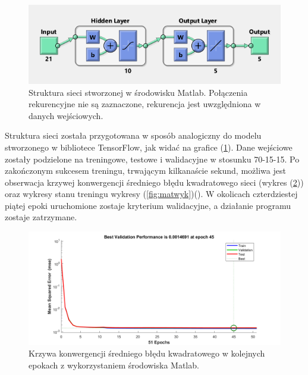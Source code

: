 \documentclass[12pt, a4paper]{article}
\let\oldref\ref
\renewcommand{\ref}[1]{(\oldref{#1})}
\begin{document}
 \begin{figure}[ht]
    \centering
    \includegraphics[width=1\textwidth]{siecmatlab}
    \caption{Struktura sieci stworzonej w środowisku Matlab. Połączenia rekurencyjne nie są zaznaczone, rekurencja jest uwzględniona w danych wejściowych.}
    \label{fig:siecmatlab}
\end{figure}

Struktura sieci została przygotowana w sposób analogiczny do modelu stworzonego w bibliotece TensorFlow, jak widać na grafice \ref{fig:siecmatlab}. Dane wejściowe zostały podzielone na treningowe, testowe i walidacyjne w stosunku 70-15-15. Po zakończonym sukcesem treningu, trwającym kilkanaście sekund, możliwa jest obserwacja krzywej konwergencji średniego błędu kwadratowego sieci (wykres \ref{fig:matper}) oraz wykresy stanu treningu wykresy \ref{fig:matwyk}(). W okolicach czterdziestej piątej epoki uruchomione zostaje kryterium walidacyjne, a działanie programu zostaje zatrzymane.


 \begin{figure}[ht]
    \centering
    \includegraphics[width=1\textwidth]{performance}
    \caption{Krzywa konwergencji średniego błędu kwadratowego w kolejnych epokach z wykorzystaniem środowiska Matlab.}
    \label{fig:matper}
\end{figure}
\end{document}
